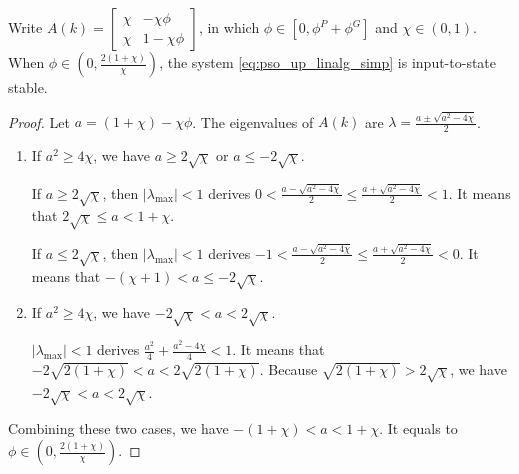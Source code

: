 \begin{mycoro}
\label{coro:param_unit_disc}
Write $ A(k) = 
\begin{bmatrix}
\chi & - \chi \phi \\
\chi & 1 - \chi \phi
\end{bmatrix}
$, in which
$ \phi \in [0,  \phi^{P} + \phi^{G} ] $ and $ \chi \in ( 0, 1 ) $.
When $ \phi \in (0 , \frac{2(1+\chi)}{\chi} ) $, the system \eqref{eq:pso_up_linalg_simp} is input-to-state stable.
\begin{proof}
Let $ a = (1 + \chi) - \chi \phi $. 
The eigenvalues of $ A(k) $ are
$ \lambda = \frac{ a \pm \sqrt{ a^{2} - 4 \chi } }{2} $.

\begin{enumerate}
\item If $ a^{2} \geq 4 \chi $, we have $ a \geq 2 \sqrt{\chi} $ or $ a \leq - 2 \sqrt{\chi} $.

If $ a \geq 2 \sqrt{\chi} $, then $ | \lambda_{\max} | < 1 $ derives $ 0 < \frac{a-\sqrt{a^{2}-4\chi}}{2} \leq \frac{a+\sqrt{a^{2}-4\chi}}{2} < 1 $.
It means that $ 2 \sqrt{ \chi } \leq a < 1 + \chi $.

If $ a \leq 2 \sqrt{\chi} $, then $ | \lambda_{\max} | < 1 $ derives $ -1 < \frac{a-\sqrt{a^{2}-4\chi}}{2} \leq \frac{a+\sqrt{a^{2}-4\chi}}{2} < 0 $.
It means that $ - (\chi+1) < a \leq - 2 \sqrt{\chi} $.

\item If $ a^{2} \geq 4 \chi $, we have $ - 2 \sqrt{\chi} < a < 2 \sqrt{\chi} $.

$ | \lambda_{\max} | < 1 $ derives $ \frac{ a^{2} }{4} + \frac{ a^{2} - 4\chi }{4} < 1 $.
It means that $ - 2 \sqrt{ 2(1+\chi) } < a < 2 \sqrt{ 2(1+\chi) } $.
Because $ \sqrt{ 2(1+\chi) } > 2 \sqrt{ \chi } $, we have $ - 2 \sqrt{\chi} < a < 2 \sqrt{\chi} $.
\end{enumerate}
Combining these two cases, we have  $ - (1 + \chi) < a < 1 + \chi $.
It equals to $ \phi \in (0 , \frac{2(1+\chi)}{\chi} ) $.

\end{proof}
\end{mycoro}

